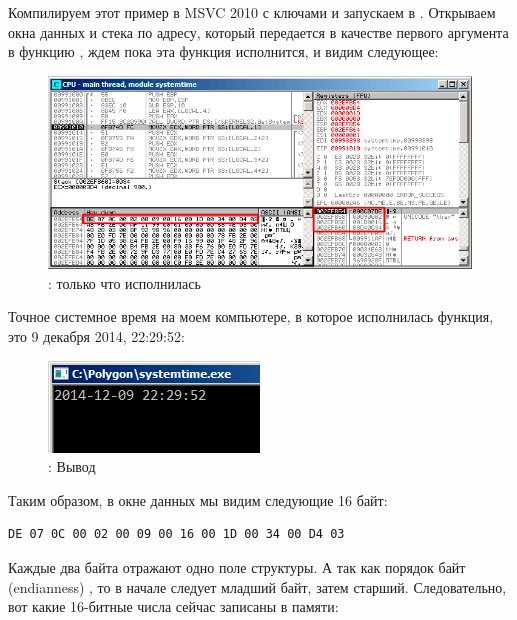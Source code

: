 ﻿\clearpage
\subsectionold{\olly}
\myindex{\olly}

Компилируем этот пример в MSVC 2010 с ключами  и запускаем в \olly.
Открываем окна данных и стека по адресу, который передается в качестве первого аргумента в функцию , 
ждем пока эта функция исполнится, и видим следующее:

\begin{figure}[H]
\centering
\includegraphics[scale=\FigScale]{patterns/15_structs/1_systemtime/olly_systemtime1.png}
\caption{\olly:  только что исполнилась}
\label{fig:struct_olly_1}
\end{figure}

Точное системное время на моем компьютере, в которое исполнилась функция, это 9 декабря 2014, 22:29:52:

\begin{figure}[H]
\centering
\includegraphics[scale=\NormalScale]{patterns/15_structs/1_systemtime/olly_systemtime2.png}
\caption{\olly: Вывод \printf}
\label{fig:struct_olly_2}
\end{figure}

Таким образом, в окне данных мы видим следующие 16 байт: 
\begin{lstlisting}
DE 07 0C 00 02 00 09 00 16 00 1D 00 34 00 D4 03
\end{lstlisting}

Каждые два байта отражают одно поле структуры. 
А так как порядок байт (\gls{endianness}) ,
то в начале следует младший байт, затем старший.
Следовательно, вот какие 16-битные числа сейчас записаны в памяти:

